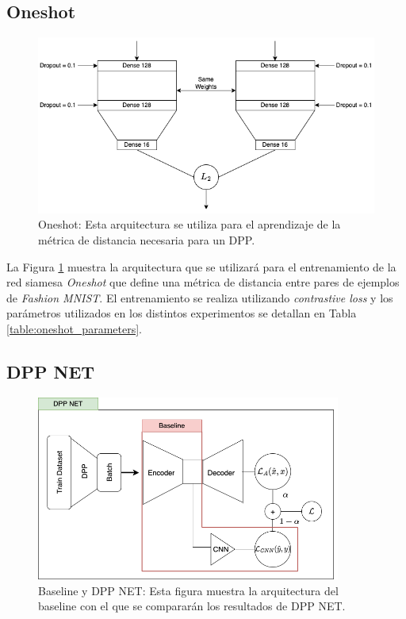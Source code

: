 \subsection{Oneshot}

\begin{figure}[h]
    \centering
    \includegraphics[width=12cm]{img/tesis/oneshot_arquitectura.png}
    \caption{Oneshot: Esta arquitectura se utiliza para el aprendizaje de la métrica de distancia necesaria para un DPP.}
    \label{fig:oneshot_arquitectura}
\end{figure}

La Figura \ref{fig:oneshot_arquitectura} muestra la arquitectura que se utilizará para el entrenamiento de la red siamesa \textit{Oneshot} que define una métrica de distancia entre pares de ejemplos de \textit{Fashion MNIST}. El entrenamiento se realiza utilizando \textit{contrastive loss} y los parámetros utilizados en los distintos experimentos se detallan en Tabla \ref{table:oneshot_parameters}.

\newpage 

\subsection{DPP NET}

\begin{figure}[h]
    \centering
    \includegraphics[width=10cm]{img/tesis/baseline_dppnet.png}
    \caption{Baseline y DPP NET: Esta figura muestra la arquitectura del baseline con el que se compararán los resultados de DPP NET.}
    \label{fig:baseline_dpp_net}
\end{figure}

